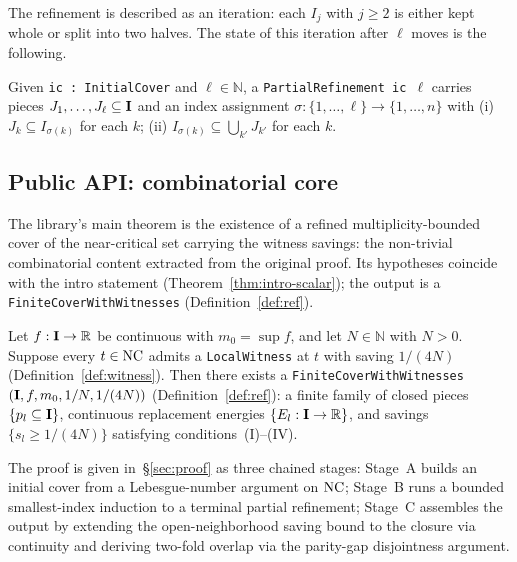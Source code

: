 The refinement is described as an iteration: each $I_j$ with
$j \ge 2$ is either kept whole or split into two halves. The
state of this iteration after $\ell$ moves is the following.

\begin{definition}
\label{def:pr}
Given \texttt{ic : InitialCover} and $\ell \in \mathbb{N}$, a
\texttt{PartialRefinement ic $\ell$} carries pieces
$J_1, \ldots, J_\ell \subseteq \mathbf{I}$ and an index assignment
$\sigma : \{1, \ldots, \ell\} \to \{1, \ldots, n\}$ with
(i) $J_k \subseteq I_{\sigma(k)}$ for each $k$;
(ii) $I_{\sigma(k)} \subseteq \bigcup_{k'} J_{k'}$ for each $k$.
\end{definition}

\subsection{Public API: combinatorial core}
\label{sec:core-spec}

The library's main theorem is the existence of a refined
multiplicity-bounded cover of the near-critical set carrying the
witness savings: the non-trivial combinatorial content extracted
from the original proof. Its hypotheses coincide with the intro
statement (Theorem~\ref{thm:intro-scalar}); the output is a
\texttt{FiniteCoverWithWitnesses} (Definition~\ref{def:ref}).

\begin{theorem}
\label{thm:core}
Let $f : \mathbf{I} \to \mathbb{R}$ be continuous with
$m_0 = \sup f$, and let $N \in \mathbb{N}$ with $N > 0$.
Suppose every $t \in \mathrm{NC}$ admits a \texttt{LocalWitness} at $t$
with saving $1/(4N)$ (Definition~\ref{def:witness}). Then there
exists a
\texttt{FiniteCoverWithWitnesses}$(\mathbf{I}, f, m_0, 1/N, 1/(4N))$
(Definition~\ref{def:ref}): a finite family of closed pieces
$\{p_l \subseteq \mathbf{I}\}$, continuous replacement energies
$\{E_l : \mathbf{I} \to \mathbb{R}\}$, and savings
$\{s_l \ge 1/(4N)\}$ satisfying conditions~(I)--(IV).
\end{theorem}

The proof is given in~\S\ref{sec:proof} as three chained stages:
Stage~A builds an initial cover from a Lebesgue-number argument
on $\mathrm{NC}$; Stage~B runs a bounded smallest-index induction to a
terminal partial refinement; Stage~C assembles the output by
extending the open-neighborhood saving bound to the closure via
continuity and deriving two-fold overlap via the parity-gap
disjointness argument.

